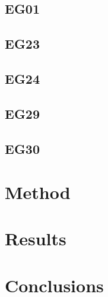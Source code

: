 \documentclass{anstrans}
\begin{document}
\subsection{EG01}



\subsection{EG23}

\subsection{EG24}

\subsection{EG29}

\subsection{EG30}

\section{Method}

\section{Results}

\section{Conclusions}



\end{document}
